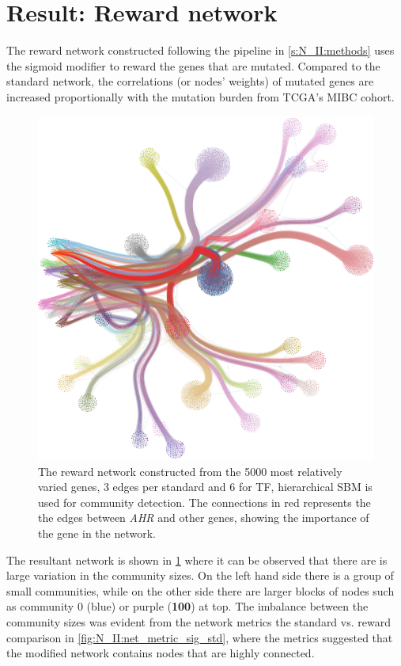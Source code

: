 \section{Result: Reward network} \label{s:N_II:rwd}

The reward network constructed following the pipeline in \cref{s:N_II:methods} uses the sigmoid modifier to reward the genes that are mutated. Compared to the standard network, the correlations (or nodes' weights) of mutated genes are increased proportionally with the mutation burden from TCGA's MIBC cohort. 


\begin{figure}[H]    
    \centering
    \includegraphics[width=1.0\textwidth,height=1.0\textheight,keepaspectratio]{Sections/Network_II/resources/reward/sigmoid_5K_AHR_sfdp.png}
    \caption{The reward network constructed from the 5000 most relatively varied genes, 3 edges per standard and 6 for TF, hierarchical SBM is used for community detection. The connections in red represents the the edges between \textit{AHR} and other genes, showing the importance of the gene in the network.}
    \label{fig:N_II:reward_net}
\end{figure}

The resultant network is shown in \cref{fig:N_II:reward_net} where it can be observed that there are is large variation in the community sizes. On the left hand side there is a group of small communities, while on the other side there are larger blocks of nodes such as community 0 (blue) or purple (\textbf{100}) at top. The imbalance between the community sizes was evident from the network metrics the standard vs. reward comparison in \cref{fig:N_II:net_metric_sig_std}, where the metrics suggested that the modified network contains nodes that are highly connected.

